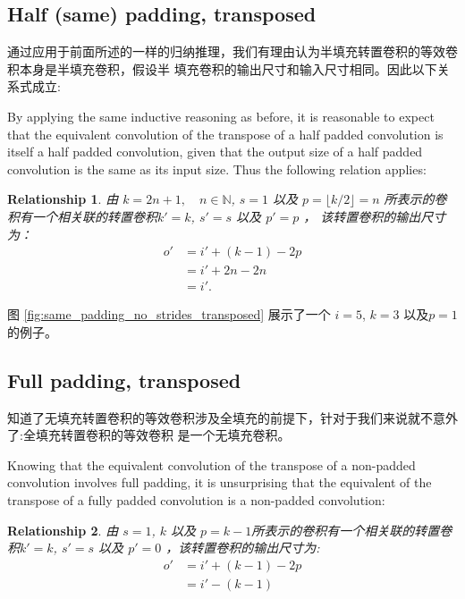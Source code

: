 \documentclass[notitlepage]{report}
\newtheorem{relationship}{Relationship}
\begin{document}
\subsection{Half (same) padding, transposed}

通过应用于前面所述的一样的归纳推理，我们有理由认为半填充转置卷积的等效卷积本身是半填充卷积，假设半
填充卷积的输出尺寸和输入尺寸相同。因此以下关系式成立:

By applying the same inductive reasoning as before, it is reasonable to expect
that the equivalent convolution of the transpose of a half padded convolution
is itself a half padded convolution, given that the output size of a half
padded convolution is the same as its input size. Thus the following relation
applies:

\begin{relationship}\label{rel:half_padding_no_strides_transposed}
由 $k = 2n + 1, \quad n \in \mathbb{N}$, $s = 1$ 以及 $p
= \lfloor k / 2 \rfloor = n$ 所表示的卷积有一个相关联的转置卷积$k' = k$, $s' = s$ 以及 $p' = p$ ，
该转置卷积的输出尺寸为：
\begin{equation*}
\begin{split}
    o' &= i' + (k - 1) - 2p \\
       &= i' + 2n - 2n \\
       &= i'.
\end{split}
\end{equation*}
\end{relationship}

图 \autoref{fig:same_padding_no_strides_transposed} 展示了一个 $i =
5$, $k = 3$ 以及$p = 1$的例子。

\subsection{Full padding, transposed}

知道了无填充转置卷积的等效卷积涉及全填充的前提下，针对于我们来说就不意外了:全填充转置卷积的等效卷积
是一个无填充卷积。

Knowing that the equivalent convolution of the transpose of a non-padded
convolution involves full padding, it is unsurprising that the equivalent of
the transpose of a fully padded convolution is a non-padded convolution:

\begin{relationship}\label{rel:full_padding_no_strides_transposed}
由 $s = 1$, $k$ 以及 $p = k - 1$所表示的卷积有一个相关联的转置卷积$k' = k$, $s' = s$ 以及 $p' = 0$
，该转置卷积的输出尺寸为:
\begin{equation*}
\begin{split}
    o' &= i' + (k - 1) - 2p \\
       &= i' - (k - 1)
\end{split}
\end{equation*}
\end{relationship}
\end{document}
